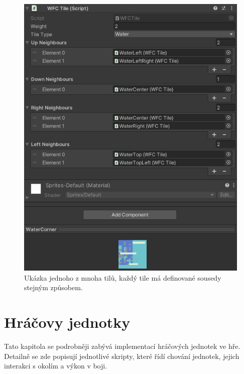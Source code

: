 \begin{figure}[H]
	\centering
	\includegraphics[scale=1]{obrazky-figures/WFCTile.png}
	\caption{Ukázka jednoho z mnoha tilů, každý tile má definované sousedy stejným způsobem.}
	\label{fig:WFCTile}
\end{figure}

\section{Hráčovy jednotky}
Tato kapitola se podrobněji zabývá implementací hráčových jednotek ve hře. Detailně se zde popisují jednotlivé skripty, které řídí chování jednotek, jejich interakci s okolím a výkon v boji.

